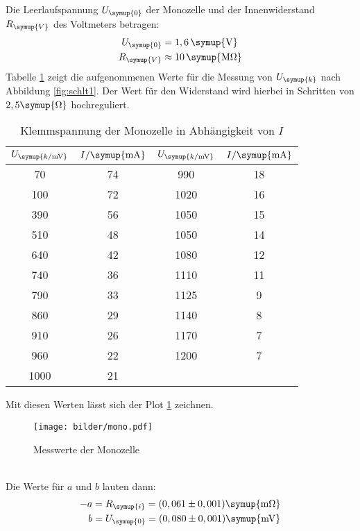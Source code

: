 Die Leerlaufspannung $U_\symup{0}$ der Monozelle und der Innenwiderstand
$R_\symup{V}$ des Voltmeters betragen:
\begin{align*}
  U_\symup{0} &= 1,6 \,\symup{\si{\volt}} \\
  R_\symup{V} &\approx 10\,\symup{\si{\mega\ohm}}
\end{align*}
Tabelle \ref{tab:U_k} zeigt die aufgenommenen Werte für die Messung von
$U_\symup{k}$ nach Abbildung \ref{fig:schlt1}. Der Wert für den Widerstand wird
hierbei in Schritten von $2,5\symup{\si\ohm}$ hochreguliert.
\begin{table}[H]
  \centering
  \begin{tabular}{c c c c}
    \toprule
    $U_\symup{k/\si{\milli\volt}}$ & $I/\symup{\si{\milli\ampere}}$  &
    $U_\symup{k/\si{\milli\volt}}$ & $I/\symup{\si{\milli\ampere}}$  \\
    \midrule
      70  &  74  &   990  &  18  \\
     100  &  72  &  1020  &  16  \\
     390  &  56  &  1050  &  15  \\
     510  &  48  &  1050  &  14  \\
     640  &  42  &  1080  &  12  \\
     740  &  36  &  1110  &  11  \\
     790  &  33  &  1125  &   9  \\
     860  &  29  &  1140  &   8  \\
     910  &  26  &  1170  &   7  \\
     960  &  22  &  1200  &   7  \\
    1000  &  21  &  \hrulefill  & \hrulefill  \\
    \bottomrule
  \end{tabular}
  \caption{Klemmspannung der Monozelle in Abhängigkeit von $I$}
  \label{tab:U_k}
\end{table}
Mit diesen Werten lässt sich der Plot \ref{fig:mono} zeichnen.
\begin{figure}[h]
  \centering
  \texttt{[image: bilder/mono.pdf]}
  \caption{Messwerte der Monozelle}
  \label{fig:mono}
\end{figure}
\\
Die Werte für $a$ und $b$ lauten dann:
\begin{align*}
  -a &= R_\symup{i} = (0,061 \pm 0,001) \symup{\si{\milli\ohm}} \\ %
   b &= U_\symup{0} = (0,080 \pm 0,001) \symup{\si{\milli\volt}}
\end{align*}
